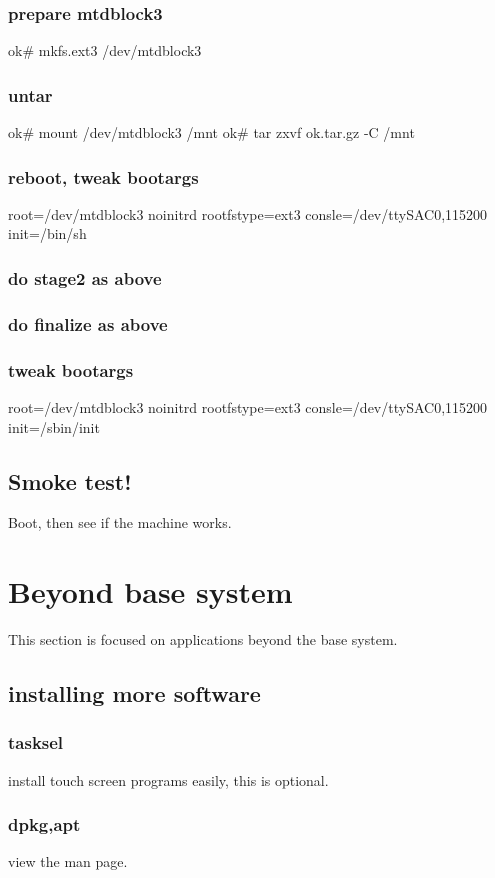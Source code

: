\documentclass[11pt,a4paper]{article}
\begin{document}
\begin{CJK}{UTF8}{gbsn}
\subsubsection{prepare mtdblock3}
ok\# mkfs.ext3 /dev/mtdblock3
\subsubsection{untar}
ok\# mount /dev/mtdblock3 /mnt
ok\# tar zxvf ok.tar.gz -C /mnt
\subsubsection{reboot, tweak bootargs}
root=/dev/mtdblock3 noinitrd rootfstype=ext3 consle=/dev/ttySAC0,115200 init=/bin/sh
\subsubsection{do stage2 as above}
\subsubsection{do finalize as above}
\subsubsection{tweak bootargs}
root=/dev/mtdblock3 noinitrd rootfstype=ext3 consle=/dev/ttySAC0,115200 init=/sbin/init

\subsection{Smoke test!}
Boot, then see if the machine works.

\section{Beyond base system}
 This section is focused on applications beyond the base system.

\subsection{installing more software}
\subsubsection{tasksel}
install touch screen programs easily, this is optional.
\subsubsection{dpkg,apt}
view the man page.


\end{CJK}
\end{document}
